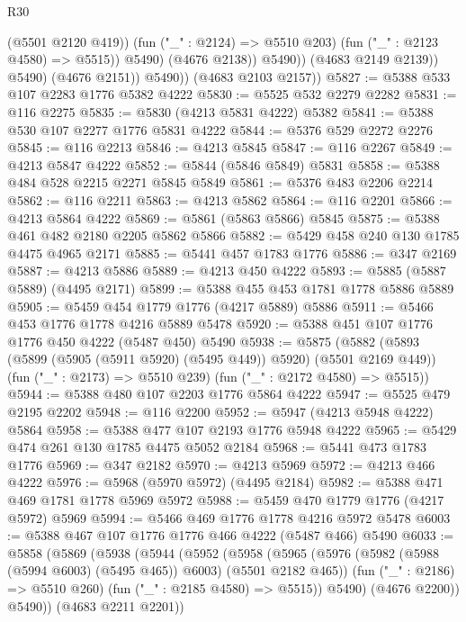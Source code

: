 \begin{lexlean}{R30}
\begin{coremodule}
{{{{{                            (@5501 @2120 @419))
                          (fun ("_" : @2124) => @5510 @203)
                          (fun ("_" : @2123 @4580) => @5515))
                        @5490)
                      (@4676 @2138))
                    @5490))
                (@4683 @2149 @2139))
              @5490)
            (@4676 @2151))
          @5490))
      (@4683 @2103 @2157))
@5827 := @5388 @533 @107 @2283 @1776 @5382 @4222
@5830 := @5525 @532 @2279 @2282
@5831 := @116 @2275
@5835 := @5830 (@4213 @5831 @4222) @5382
@5841 := @5388 @530 @107 @2277 @1776 @5831 @4222
@5844 := @5376 @529 @2272 @2276
@5845 := @116 @2213
@5846 := @4213 @5845
@5847 := @116 @2267
@5849 := @4213 @5847 @4222
@5852 := @5844 (@5846 @5849) @5831
@5858 := @5388 @484 @528 @2215 @2271 @5845 @5849
@5861 := @5376 @483 @2206 @2214
@5862 := @116 @2211
@5863 := @4213 @5862
@5864 := @116 @2201
@5866 := @4213 @5864 @4222
@5869 := @5861 (@5863 @5866) @5845
@5875 := @5388 @461 @482 @2180 @2205 @5862 @5866
@5882 := @5429 @458 @240 @130 @1785 @4475 @4965 @2171
@5885 := @5441 @457 @1783 @1776
@5886 := @347 @2169
@5887 := @4213 @5886
@5889 := @4213 @450 @4222
@5893 := @5885 (@5887 @5889) (@4495 @2171)
@5899 := @5388 @455 @453 @1781 @1778 @5886 @5889
@5905 := @5459 @454 @1779 @1776 (@4217 @5889) @5886
@5911 := @5466 @453 @1776 @1778 @4216 @5889 @5478
@5920 := @5388 @451 @107 @1776 @1776 @450 @4222 (@5487 @450) @5490
@5938 := @5875
    (@5882
      (@5893 (@5899 (@5905 (@5911 @5920) (@5495 @449)) @5920) (@5501 @2169 @449))
      (fun ("_" : @2173) => @5510 @239)
      (fun ("_" : @2172 @4580) => @5515))
@5944 := @5388 @480 @107 @2203 @1776 @5864 @4222
@5947 := @5525 @479 @2195 @2202
@5948 := @116 @2200
@5952 := @5947 (@4213 @5948 @4222) @5864
@5958 := @5388 @477 @107 @2193 @1776 @5948 @4222
@5965 := @5429 @474 @261 @130 @1785 @4475 @5052 @2184
@5968 := @5441 @473 @1783 @1776
@5969 := @347 @2182
@5970 := @4213 @5969
@5972 := @4213 @466 @4222
@5976 := @5968 (@5970 @5972) (@4495 @2184)
@5982 := @5388 @471 @469 @1781 @1778 @5969 @5972
@5988 := @5459 @470 @1779 @1776 (@4217 @5972) @5969
@5994 := @5466 @469 @1776 @1778 @4216 @5972 @5478
@6003 := @5388 @467 @107 @1776 @1776 @466 @4222 (@5487 @466) @5490
@6033 := @5858
    (@5869
      (@5938
        (@5944
          (@5952
            (@5958
              (@5965
                (@5976 (@5982 (@5988 (@5994 @6003) (@5495 @465)) @6003) (@5501 @2182 @465))
                (fun ("_" : @2186) => @5510 @260)
                (fun ("_" : @2185 @4580) => @5515))
              @5490)
            (@4676 @2200))
          @5490))
      (@4683 @2211 @2201))
}}}}}
\end{coremodule}
\end{lexlean}
